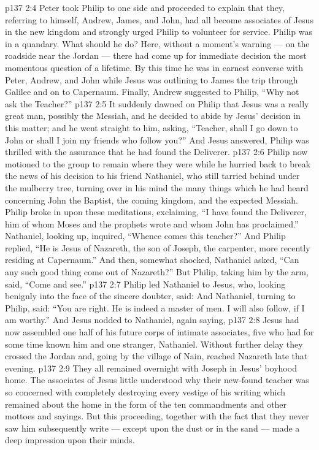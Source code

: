 \vs p137 2:4 Peter took Philip to one side and proceeded to explain that they, referring to himself, Andrew, James, and John, had all become associates of Jesus in the new kingdom and strongly urged Philip to volunteer for service. Philip was in a quandary. What should he do? Here, without a moment’s warning --- on the roadside near the Jordan --- there had come up for immediate decision the most momentous question of a lifetime. By this time he was in earnest converse with Peter, Andrew, and John while Jesus was outlining to James the trip through Galilee and on to Capernaum. Finally, Andrew suggested to Philip, “Why not ask the Teacher?”
\vs p137 2:5 It suddenly dawned on Philip that Jesus was a really great man, possibly the Messiah, and he decided to abide by Jesus’ decision in this matter; and he went straight to him, asking, “Teacher, shall I go down to John or shall I join my friends who follow you?” And Jesus answered,  Philip was thrilled with the assurance that he had found the Deliverer.
\vs p137 2:6 \pc Philip now motioned to the group to remain where they were while he hurried back to break the news of his decision to his friend Nathaniel, who still tarried behind under the mulberry tree, turning over in his mind the many things which he had heard concerning John the Baptist, the coming kingdom, and the expected Messiah. Philip broke in upon these meditations, exclaiming, “I have found the Deliverer, him of whom Moses and the prophets wrote and whom John has proclaimed.” Nathaniel, looking up, inquired, “Whence comes this teacher?” And Philip replied, “He is Jesus of Nazareth, the son of Joseph, the carpenter, more recently residing at Capernaum.” And then, somewhat shocked, Nathaniel asked, “Can any such good thing come out of Nazareth?” But Philip, taking him by the arm, said, “Come and see.”
\vs p137 2:7 Philip led Nathaniel to Jesus, who, looking benignly into the face of the sincere doubter, said:  And Nathaniel, turning to Philip, said: “You are right. He is indeed a master of men. I will also follow, if I am worthy.” And Jesus nodded to Nathaniel, again saying, 
\vs p137 2:8 \pc Jesus had now assembled one half of his future corps of intimate associates, five who had for some time known him and one stranger, Nathaniel. Without further delay they crossed the Jordan and, going by the village of Nain, reached Nazareth late that evening.
\vs p137 2:9 They all remained overnight with Joseph in Jesus’ boyhood home. The associates of Jesus little understood why their new\hyp{}found teacher was so concerned with completely destroying every vestige of his writing which remained about the home in the form of the ten commandments and other mottoes and sayings. But this proceeding, together with the fact that they never saw him subsequently write --- except upon the dust or in the sand --- made a deep impression upon their minds.
